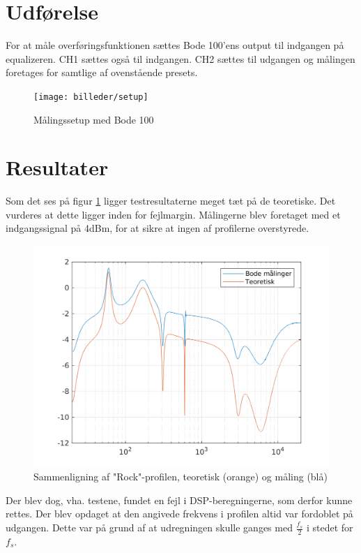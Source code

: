 \section{Udførelse}
For at måle overføringsfunktionen sættes Bode 100'ens output til indgangen på equalizeren. CH1 sættes også til indgangen. CH2 sættes til udgangen og målingen foretages for samtlige af ovenstående presets.


\begin{figure}[h!]
	\centering
	\texttt{[image: billeder/setup]}
	\caption{Målingssetup med Bode 100}
\end{figure}	


\section{Resultater}
Som det ses på figur \ref{fig:rock_test} ligger testresultaterne meget tæt på de teoretiske. Det vurderes at dette ligger inden for fejlmargin. Målingerne blev foretaget med et indgangssignal på 4dBm, for at sikre at ingen af profilerne overstyrede.


\begin{figure}[h!]
	\centering
	\includegraphics[width=15cm]{billeder/rock_test}
	\caption{Sammenligning af "Rock"-profilen, teoretisk (orange) og måling (blå)}
	\label{fig:rock_test}
\end{figure}
	

Der blev dog, vha. testene, fundet en fejl i DSP-beregningerne, som derfor kunne rettes. Der blev opdaget at den angivede frekvens i profilen altid var fordoblet på udgangen. Dette var på grund af at udregningen skulle ganges med $\frac{f_s}{2}$ i stedet for $f_s$. \\ 

